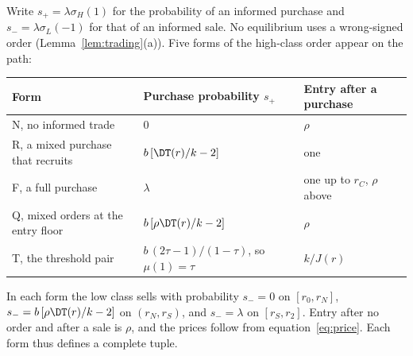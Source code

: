 Write \(s_+=\lambda\sigma_H(1)\) for the probability of an informed purchase and \(s_-=\lambda\sigma_L(-1)\) for
that of an informed sale. No equilibrium uses a wrong-signed order (Lemma~\ref{lem:trading}(a)). Five forms of the
high-class order appear on the path:
\begin{center}\small\singlespacing
\begin{tabular}{@{}lll@{}}
\toprule
Form & Purchase probability \(s_+\) & Entry after a purchase\\
\midrule
N, no informed trade & \(0\) & \(\rho\)\\
R, a mixed purchase that recruits & \(b\,[\DT(r)/k-2]\) & one\\
F, a full purchase & \(\lambda\) & one up to \(r_C\), \(\rho\) above\\
Q, mixed orders at the entry floor & \(b\,[\rho\DT(r)/k-2]\) & \(\rho\)\\
T, the threshold pair & \(b\,(2\tau-1)/(1-\tau)\), so \(\mu(1)=\tau\) & \(k/J(r)\)\\
\bottomrule
\end{tabular}
\end{center}
In each form the low class sells with probability \(s_-=0\) on \([r_0,r_N]\), \(s_-=b\,[\rho\DT(r)/k-2]\) on
\((r_N,r_S)\), and \(s_-=\lambda\) on \([r_S,r_2]\). Entry after no order and after a sale is \(\rho\), and the
prices follow from equation~\eqref{eq:price}. Each form thus defines a complete tuple.

